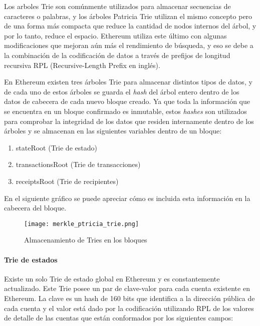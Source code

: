 Los arboles Trie son comúnmente utilizados para almacenar secuencias de caracteres o palabras, y los árboles Patricia Trie utilizan el mismo concepto pero de una forma más compacta que reduce la cantidad de nodos internos del árbol, y por lo tanto, reduce el espacio. Ethereum utiliza este último con algunas modificaciones que mejoran aún más el rendimiento de búsqueda, y eso se debe a la combinación de la codificación de datos a través de prefijos de longitud recursiva RPL (Recursive-Length Prefix en inglés).

En Ethereum existen tres árboles Trie para almacenar distintos tipos de datos, y de cada uno de estos árboles se guarda el \textit{hash} del árbol entero dentro de los datos de cabecera de cada nuevo bloque creado. Ya que toda la información que se encuentra en un bloque confirmado es inmutable, estos \textit{hashes} son utilizados para comprobar la integridad de los datos que residen internamente dentro de los árboles y se almacenan en las siguientes variables dentro de un bloque:

\begin{enumerate}
  \item stateRoot (Trie de estado)
  \item transactionsRoot (Trie de transacciones)
  \item receiptsRoot (Trie de recipientes)
\end{enumerate}

En el siguiente gráfico se puede apreciar cómo es incluida esta información en la cabecera del bloque.

\begin{figure}[H]
  \texttt{[image: merkle\_ptricia\_trie.png]}
  \centering
  \caption{Almacenamiento de Tries en los bloques}
  \label{fig:merkle-ptricia-trie}
\end{figure}

\paragraph{Trie de estados}

Existe un solo Trie de estado global en Ethereum y es constantemente actualizado. Este Trie posee un par de clave-valor para cada cuenta existente en Ethereum. La clave es un hash de 160 bits que identifica a la dirección pública de cada cuenta y el valor está dado por la codificación utilizando RPL de los valores de detalle de las cuentas que están conformados por los siguientes campos:

